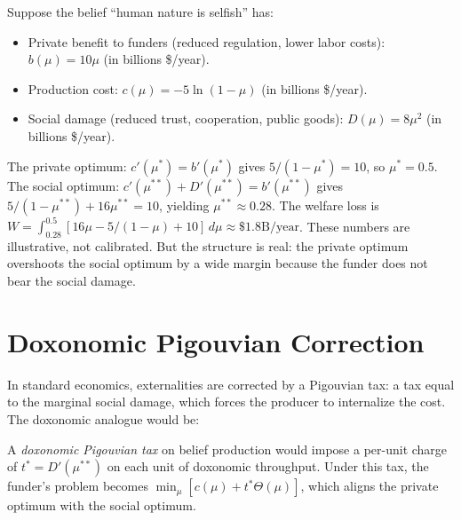 \begin{example}
\label{ex:welfare-loss}
Suppose the belief ``human nature is selfish'' has:
\begin{itemize}[nosep]
  \item Private benefit to funders (reduced regulation, lower labor costs): $b(\mu) = 10\mu$ (in billions \$/year).
  \item Production cost: $c(\mu) = -5\ln(1-\mu)$ (in billions \$/year).
  \item Social damage (reduced trust, cooperation, public goods): $D(\mu) = 8\mu^2$ (in billions \$/year).
\end{itemize}
The private optimum: $c'(\mu^*) = b'(\mu^*)$ gives $5/(1-\mu^*) = 10$, so $\mu^* = 0.5$.
The social optimum: $c'(\mu^{**}) + D'(\mu^{**}) = b'(\mu^{**})$ gives $5/(1-\mu^{**}) + 16\mu^{**} = 10$, yielding $\mu^{**} \approx 0.28$.
The welfare loss is $W = \int_{0.28}^{0.5} [16\mu - 5/(1-\mu) + 10] \, d\mu \approx \$1.8\text{B/year}$.
These numbers are illustrative, not calibrated.
But the structure is real: the private optimum overshoots the social optimum by a wide margin because the funder does not bear the social damage.
\end{example}


\section{Doxonomic Pigouvian Correction}
\label{sec:ch10-pigouvian}

In standard economics, externalities are corrected by a Pigouvian tax: a tax equal to the marginal social damage, which forces the producer to internalize the cost.
The doxonomic analogue would be:

\begin{model}
\label{mod:pigouvian}
A \emph{doxonomic Pigouvian tax} on belief production would impose a per-unit charge of $t^* = D'(\mu^{**})$ on each unit of doxonomic throughput.
Under this tax, the funder's problem becomes $\min_\mu [c(\mu) + t^*\Theta(\mu)]$, which aligns the private optimum with the social optimum.
\end{model}

